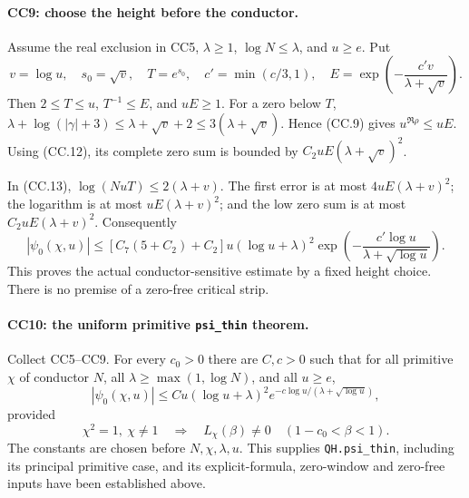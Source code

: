 \paragraph{CC9: choose the height before the conductor.}
Assume the real exclusion in CC5, $\lambda\ge1$,
$\log N\le\lambda$, and $u\ge e$. Put
\[
 v=\log u,\quad s_0=\sqrt v,\quad T=e^{s_0},\quad
 c'=\min(c/3,1),\quad
 E=\exp\left(-\frac{c'v}{\lambda+\sqrt v}\right).
\]
Then $2\le T\le u$, $T^{-1}\le E$, and $uE\ge1$.
For a zero below $T$,
$\lambda+\log(|\gamma|+3)\le\lambda+\sqrt v+2
\le3(\lambda+\sqrt v)$.
Hence (CC.9) gives $u^{\Re\rho}\le uE$.
Using (CC.12), its complete zero sum is bounded by
$C_2uE(\lambda+\sqrt v)^2$.

In (CC.13), $\log(NuT)\le2(\lambda+v)$.
The first error is at most $4uE(\lambda+v)^2$;
the logarithm is at most $uE(\lambda+v)^2$; and the low zero
sum is at most $C_2uE(\lambda+v)^2$.
Consequently
\[
 |\psi_0(\chi,u)|\le
 [C_7(5+C_2)+C_2]u(\log u+\lambda)^2
             \exp\left(-\frac{c'\log u}
                              {\lambda+\sqrt{\log u}}\right).
                                                               \tag{CC.14}
\]
This proves the actual conductor-sensitive estimate by a fixed
height choice. There is no premise of a zero-free critical strip.

\paragraph{CC10: the uniform primitive \texttt{psi\_thin} theorem.}
Collect CC5--CC9. For every $c_0>0$ there are $C,c>0$ such that
for all primitive $\chi$ of conductor $N$, all
$\lambda\ge\max(1,\log N)$, and all $u\ge e$,
\[
 |\psi_0(\chi,u)|\le Cu(\log u+\lambda)^2
                  e^{-c\log u/(\lambda+\sqrt{\log u})},        \tag{CC.15}
\]
provided
\[
 \chi^2=1,\ \chi\ne1\quad\Longrightarrow\quad
     L_\chi(\beta)\ne0\quad(1-c_0<\beta<1).             \tag{CC.16}
\]
The constants are chosen before $N,\chi,\lambda,u$.
This supplies \texttt{QH.psi\_thin}, including its principal
primitive case, and its explicit-formula, zero-window and
zero-free inputs have been established above.

